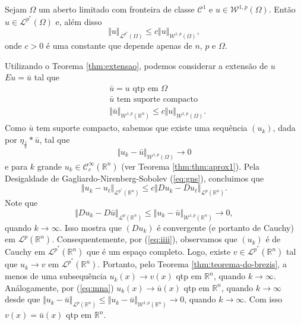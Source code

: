 \documentclass[a4paper, 11pt]{book}
\theoremstyle{definition}
\newcommand{\bR}{\mathbb{R}}
\newcommand{\cC}{\mathcal{C}}
\newcommand{\cL}{\mathcal{L}}
\newcommand{\cW}{\mathcal{W}}
\begin{document}
\begin{tbox} \label{thm:desigualdade-teorema-2}
    Sejam $\Omega$ um aberto limitado com fronteira de classe $\cC^1$ e $u \in \cW^{1,p}(\Omega)$. Então $u \in \cL^{p^*}(\Omega)$ e, além disso
    \[
        \Vert u \Vert_{\cL^{p^*}(\Omega)} \leqslant c \Vert u \Vert_{\cW^{1,p}(\Omega)},
    \]
    onde $c > 0$ é uma constante que depende apenas de $n$, $p$ e $\Omega$.
\end{tbox}
\begin{prf}
    Utilizando o Teorema \ref{thm:extensao}, podemos considerar a extensão de $u$ $Eu = \bar u$ tal que
    \begin{equation} \label{eq:man}
        \begin{aligned}
            &\bar u = u \text{ qtp em } \Omega\\
            &\bar u \text{ tem suporte compacto}\\
            &\Vert \bar u \Vert_{\cW^{1,p}(\bR^n)} \leqslant c\Vert u \Vert_{\cW^{1,p}(\Omega)}.
        \end{aligned}
    \end{equation}
    Como $\bar u$ tem suporte compacto, sabemos que existe uma sequência $(u_k)$, dada por $\eta_{\frac{1}{k}} * \bar u$, tal que
    \begin{equation} \label{eq:mna}
        \Vert u_k - \bar u \Vert_{\cW^{1,p}(\Omega)} \to 0
    \end{equation}
    e para $k$ grande $u_k \in \cC^{\infty}_c(\bR^n)$ (ver Teorema \ref{thm:thm:aprox1}).
    Pela Desigaldade de Gagliardo-Nirenberg-Sobolev (\ref{eq:gns}), concluimos que
    \begin{equation} \label{eq:iiii}
        \Vert u_k - u_\ell \Vert_{\cL^{p^*}(\bR^n)} \leqslant c \Vert Du_k - Du_\ell \Vert_{\cL^p(\bR^n)}.
    \end{equation}
    Note que
    \[
        \Vert Du_k - D\bar u \Vert_{\cL^p(\bR^n)} \leqslant \Vert u_k - \bar u \Vert_{\cW^{1,p}(\bR^n)} \to 0,
    \]
    quando $k \to \infty$.
    Isso mostra que $(Du_k)$ é convergente (e portanto de Cauchy) em $\cL^p(\bR^n)$.
    Consequentemente, por (\ref{eq:iiii}), observamos que $(u_k)$ é de Cauchy em $\cL^{p^*}(\bR^n)$ que é um espaço completo. Logo, existe $v \in \cL^{p^*}(\bR^n)$ tal que $u_k \to v$ em $\cL^{p^*}(\bR^n)$. Portanto, pelo Teorema \ref{thm:teorema-do-brezis}, a menos de uma subsequência $u_k(x) \to v(x)$ qtp em $\bR^n$, quando $k \to \infty$. Análogamente, por (\ref{eq:mna}) $u_k(x) \to \bar u(x)$ qtp em $\bR^n$, quando $k \to \infty$ desde que $\Vert u_k - \bar u \Vert_{\cL^p(\bR^n)} \leqslant \Vert u_k - \bar u \Vert_{\cW^{1,p}(\bR^n)} \to 0$, quando $k \to \infty$. Com isso $v(x) = \bar u(x)$ qtp em $\bR^n$.

\end{prf}
\end{document}
